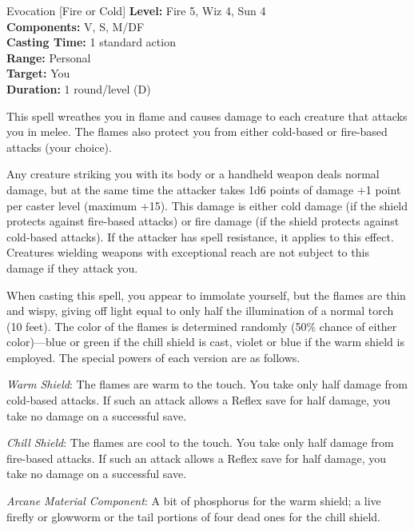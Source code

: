 {Evocation [Fire or Cold]}
{
	\textbf{Level:}
	Fire 5, Wiz 4, Sun 4\\
	\textbf{Components:}
	V, S, M/DF\\
	\textbf{Casting Time:}
	1 standard action\\
	\textbf{Range:}
	Personal\\
	\textbf{Target:}
	You\\
	\textbf{Duration:}
	1 round/level (D)\\
}
{
	This spell wreathes you in flame and causes damage to each creature that attacks you in melee. The flames also protect you from either cold-based or fire-based attacks (your choice).

	Any creature striking you with its body or a handheld weapon deals normal damage, but at the same time the attacker takes 1d6 points of damage +1 point per caster level (maximum +15). This damage is either cold damage (if the shield protects against fire-based attacks) or fire damage (if the shield protects against cold-based attacks). If the attacker has spell resistance, it applies to this effect. Creatures wielding weapons with exceptional reach are not subject to this damage if they attack you.

	When casting this spell, you appear to immolate yourself, but the flames are thin and wispy, giving off light equal to only half the illumination of a normal torch (10 feet). The color of the flames is determined randomly (50\% chance of either color)---blue or green if the chill shield is cast, violet or blue if the warm shield is employed. The special powers of each version are as follows.

	\textit{Warm Shield}:
	The flames are warm to the touch. You take only half damage from cold-based attacks. If such an attack allows a Reflex save for half damage, you take no damage on a successful save.

	\textit{Chill Shield}:
	The flames are cool to the touch. You take only half damage from fire-based attacks. If such an attack allows a Reflex save for half damage, you take no damage on a successful save.

	\textit{Arcane Material Component}:
	A bit of phosphorus for the warm shield; a live firefly or glowworm or the tail portions of four dead ones for the chill shield.

}
